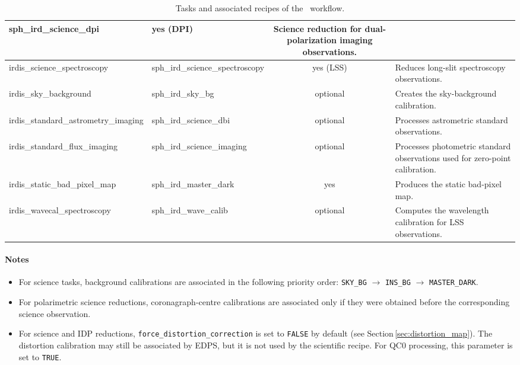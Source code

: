 \begin{table}[htbp]
\begin{tabular}{|l|l|c|p{7cm}|}
sph\_ird\_science\_dpi &
yes (DPI) &
Science reduction for dual-polarization imaging observations. \\
\hline
irdis\_science\_spectroscopy &
sph\_ird\_science\_spectroscopy &
yes (LSS) &
Reduces long-slit spectroscopy observations. \\
\hline
irdis\_sky\_background &
sph\_ird\_sky\_bg &
optional &
Creates the sky-background calibration. \\
\hline
irdis\_standard\_astrometry\_imaging &
sph\_ird\_science\_dbi &
optional &
Processes astrometric standard observations. \\
\hline
irdis\_standard\_flux\_imaging &
sph\_ird\_science\_imaging &
optional &
Processes photometric standard observations used for zero-point calibration. \\
\hline
irdis\_static\_bad\_pixel\_map &
sph\_ird\_master\_dark &
yes &
Produces the static bad-pixel map. \\
\hline
irdis\_wavecal\_spectroscopy &
sph\_ird\_wave\_calib &
optional &
Computes the wavelength calibration for LSS observations. \\
\hline
\end{tabular}
\caption{Tasks and associated recipes of the \instname\ workflow.}
\label{tab:irdis_workflow_tasks}
\end{table}

\paragraph{Notes}

\begin{itemize}
\item For science tasks, background calibrations are associated in the following priority order:
\texttt{SKY\_BG}
$\rightarrow$
\texttt{INS\_BG}
$\rightarrow$
\texttt{MASTER\_DARK}.

\item For polarimetric science reductions, coronagraph-centre calibrations are associated only if they were obtained before the corresponding science observation.

\item For science and IDP reductions, \texttt{force\_distortion\_correction} is set to
\texttt{FALSE} by default (see Section\,\ref{sec:distortion_map}). The distortion calibration may still be associated by EDPS, but it is not used by the scientific recipe. For QC0 processing, this
parameter is set to \texttt{TRUE}.

\end{itemize}
